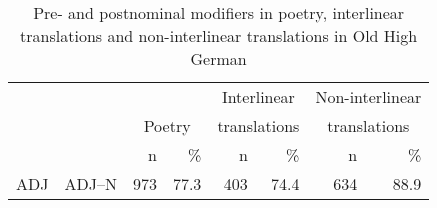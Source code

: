 \documentclass[output=paper,colorlinks,citecolor=brown,draft]{langscibook}
\begin{document}
\begin{table}
\caption{Pre- and postnominal modifiers in poetry, interlinear translations and non-interlinear translations in Old High German}
\label{tabOHGtext}
%
\begin{tabular}{ll rr rr rr}
\lsptoprule
       &      &     &     & \multicolumn{2}{c}{Interlinear}&\multicolumn{2}{c}{Non-interlinear}\\
       &      & \multicolumn{2}{c}{Poetry}  &\multicolumn{2}{c}{translations} & \multicolumn{2}{c}{translations}\\
       \cmidrule(lr){3-4}\cmidrule(lr){5-6}\cmidrule(lr){7-8}
       & & n & \%& n & \%& n & \%\\
   \midrule
   ADJ & ADJ--N   & 973   & 77.3 & 403 & 74.4 & 634  & 88.9\\

\end{tabular}
\end{table}
\end{document}
